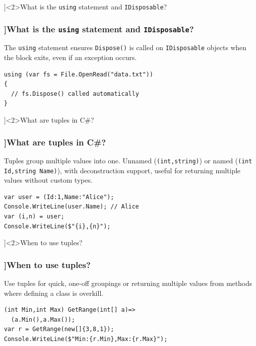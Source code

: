 \QuestionSlide[\CategoryBadge[LangColor!20]{Language Feature}]<2>{What is the \texttt{using} statement and \texttt{IDisposable}?}
\begin{frame}[fragile]
  \frametitle{\AnswerTitle[\CategoryBadge[LangColor!20]{Language Feature}]{What is the \texttt{using} statement and \texttt{IDisposable}?}}

  {\footnotesize
    The \texttt{using} statement ensures \texttt{Dispose()} is called on \texttt{IDisposable} objects when the block exits, even if an exception occurs.
  }

  \begin{verbatim}
using (var fs = File.OpenRead("data.txt"))
{
  // fs.Dispose() called automatically
}
  \end{verbatim}
\end{frame}

\QuestionSlide[\CategoryBadge[LangColor!20]{Language Feature}]<2>{What are tuples in C\#?}
\begin{frame}[fragile]
  \frametitle{\AnswerTitle[\CategoryBadge[LangColor!20]{Language Feature}]{What are tuples in C\#?}}

  {\footnotesize
    Tuples group multiple values into one. Unnamed (\texttt{(int,string)}) or named (\texttt{(int Id,string Name)}), with deconstruction support, useful for returning multiple values without custom types.
  }

  \begin{verbatim}
var user = (Id:1,Name:"Alice");
Console.WriteLine(user.Name); // Alice
var (i,n) = user;
Console.WriteLine($"{i},{n}");
  \end{verbatim}
\end{frame}

\QuestionSlide[\CategoryBadge[LangColor!20]{Language Feature}]<2>{When to use tuples?}
\begin{frame}[fragile]
  \frametitle{\AnswerTitle[\CategoryBadge[LangColor!20]{Language Feature}]{When to use tuples?}}

  {\footnotesize
    Use tuples for quick, one-off groupings or returning multiple values from methods where defining a class is overkill.
  }

  \begin{verbatim}
(int Min,int Max) GetRange(int[] a)=>
  (a.Min(),a.Max());
var r = GetRange(new[]{3,8,1});
Console.WriteLine($"Min:{r.Min},Max:{r.Max}");
  \end{verbatim}
\end{frame}

